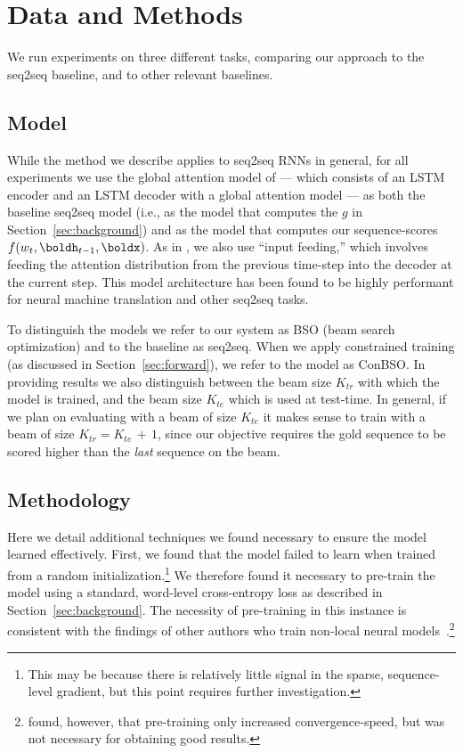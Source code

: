 \documentclass[11pt,letterpaper]{article}
\begin{document}
 
 
  





 


\section{Data and Methods}
We run experiments on three different tasks, comparing our approach to
the seq2seq baseline, and to other relevant baselines.

\subsection{Model}
While the method we describe applies to seq2seq RNNs in general,
for all experiments we use the global attention model of  ---
which consists of an LSTM~\cite{hochreiter1997lstm} encoder and an
LSTM decoder with a global attention model --- as both the baseline
seq2seq model (i.e., as the model that computes the $g$ in
Section~\ref{sec:background}) and as the model that computes our
sequence-scores $f(w_{t}, \boldh_{t-1}, \boldx)$. As in , we also use
``input feeding,'' which involves feeding the attention distribution
from the previous time-step into the decoder at the current step. 
This model architecture has been found to be highly performant for neural
machine translation and other seq2seq tasks. 

To distinguish the models we refer to our system as BSO (beam search
optimization) and to the baseline as seq2seq. When we apply constrained training (as discussed in Section~\ref{sec:forward}), we refer to the model as ConBSO. In providing results we also distinguish between the
beam size $K_{tr}$ with which the model is trained, and the beam size
$K_{te}$ which is used at test-time. In general, if we plan on
evaluating with a beam of size $K_{te}$ it makes sense to train with a
beam of size $K_{tr} = K_{te} \, {+} \, 1$, since our objective requires the
gold sequence to be scored higher than the \textit{last} sequence on
the beam.

\subsection{Methodology}
Here we detail additional techniques we found necessary to ensure the model learned effectively. First, we found that the model failed to learn when trained
from a random initialization.\footnote{This may be because there is relatively little signal in the sparse, sequence-level gradient, but this point requires further investigation.} We therefore found it necessary to pre-train the model using a standard,
word-level cross-entropy loss as described in
Section~\ref{sec:background}. The necessity of pre-training in this instance is consistent with the findings of other authors who train non-local neural models~\cite{kingsbury09lattice,sak14sequence,andor16globally,ranzato16sequence}.\footnote{ found, however, that pre-training only increased convergence-speed, but was not necessary for obtaining good results.}
\end{document}

